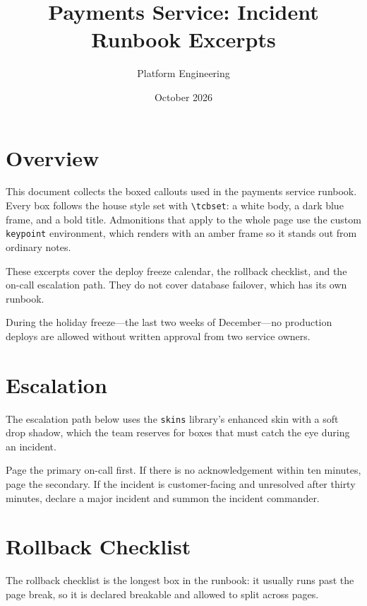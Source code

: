 \documentclass[11pt]{article}
\title{Payments Service: Incident Runbook Excerpts}
\author{Platform Engineering}
\date{October 2026}
\begin{document}
\maketitle

\section{Overview}
This document collects the boxed callouts used in the payments service
runbook. Every box follows the house style set with \verb|\tcbset|:
a white body, a dark blue frame, and a bold title. Admonitions that
apply to the whole page use the custom \verb|keypoint| environment,
which renders with an amber frame so it stands out from ordinary
notes.

\begin{tcolorbox}[title=Scope]
These excerpts cover the deploy freeze calendar, the rollback
checklist, and the on-call escalation path. They do not cover
database failover, which has its own runbook.
\end{tcolorbox}

\begin{keypoint}
During the holiday freeze---the last two weeks of December---no
production deploys are allowed without written approval from two
service owners.
\end{keypoint}

\section{Escalation}
The escalation path below uses the \verb|skins| library's enhanced
skin with a soft drop shadow, which the team reserves for boxes that
must catch the eye during an incident.

\begin{tcolorbox}[enhanced, title=Escalation path, drop fuzzy shadow,
  colback=red!5, colframe=red!60!black]
Page the primary on-call first. If there is no acknowledgement within
ten minutes, page the secondary. If the incident is customer-facing
and unresolved after thirty minutes, declare a major incident and
summon the incident commander.
\end{tcolorbox}

\section{Rollback Checklist}
The rollback checklist is the longest box in the runbook: it usually
runs past the page break, so it is declared breakable and allowed to
split across pages.
\end{document}
